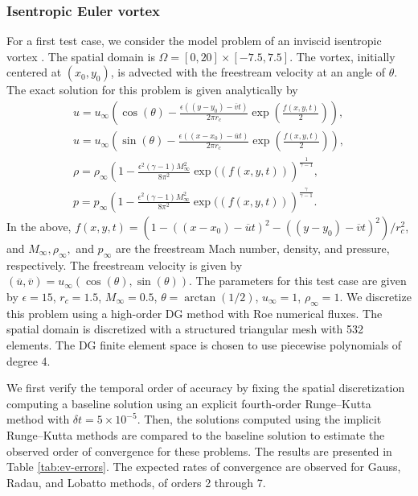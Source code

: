 \documentclass[review]{siamart}
\begin{document}
\subsubsection{Isentropic Euler vortex}
For a first test case, we consider the model problem of an inviscid isentropic
vortex \cite{Shu1998,Wang2013}. The spatial domain is $\Omega = [0,20] \times
[-7.5,7.5]$. The vortex, initially centered at $(x_0, y_0)$, is advected with
the freestream velocity at an angle of $\theta$. The exact solution for this
problem is given analytically by
\begin{gather}
\label{eq:ev-exact-1}
   u = u_\infty \left( \cos(\theta) - \frac{\epsilon ((y-y_0)
       - \overline{v} t)}{2\pi r_c}
       \exp\left( \frac{f(x,y,t)}{2} \right) \right),\\
\label{eq:ev-exact-2}
   u = u_\infty \left( \sin(\theta) - \frac{\epsilon ((x-x_0)
       - \overline{u} t)}{2\pi r_c}
       \exp\left( \frac{f(x,y,t)}{2} \right) \right),\\
\label{eq:ev-exact-3}
   \rho = \rho_\infty \left( 1 -
       \frac{\epsilon^2 (\gamma - 1)M^2_\infty}{8\pi^2} \exp((f(x,y,t))
       \right)^{\frac{1}{\gamma-1}}, \\
\label{eq:ev-exact-4}
   p = p_\infty \left( 1 -
       \frac{\epsilon^2 (\gamma - 1)M^2_\infty}{8\pi^2} \exp((f(x,y,t))
       \right)^{\frac{\gamma}{\gamma-1}}.
\end{gather}
In the above, $f(x,y,t) = (1 - ((x-x_0) - \overline{u}t)^2 - ((y-y_0) - \overline{v}t)^2)/r_c^2$, and $M_\infty, \rho_\infty,$ and $p_\infty$ are the freestream Mach number, density, and pressure, respectively.
The freestream velocity is given by $(\overline{u},\overline{v}) = u_\infty (\cos(\theta), \sin(\theta))$.
The parameters for this test case are given by $\epsilon = 15$, $r_c = 1.5$, $M_\infty = 0.5$, $\theta = \arctan(1/2)$, $u_\infty = 1$, $\rho_\infty = 1$.
We discretize this problem using a high-order DG method with Roe numerical fluxes.
The spatial domain is discretized with a structured triangular mesh with 532 elements.
The DG finite element space is chosen to use piecewise polynomials of degree 4.

We first verify the temporal order of accuracy by fixing the spatial discretization  computing a baseline solution using an explicit fourth-order Runge--Kutta method with $\delta t = 5\times 10^{-5}$.
Then, the solutions computed using the implicit Runge--Kutta methods are compared to the baseline solution to estimate the observed order of convergence for these problems.
The results are presented in Table \ref{tab:ev-errors}.
The expected rates of convergence are observed for Gauss, Radau, and Lobatto methods, of orders 2 through 7.
\end{document}
